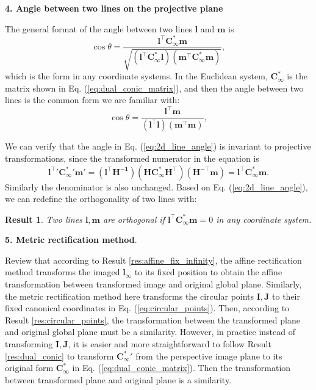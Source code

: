 \documentclass[12pt]{article}
\newtheorem{result}{Result}[section]
\numberwithin{equation}{section}
\begin{document}
\textbf{4. Angle between two lines on the projective plane}

The general format of the angle between two lines $\mathbf{l}$ and $\mathbf{m}$ is
\begin{equation}
\cos \theta = \frac{\mathbf{l^\top C_{\infty}^* m}}{\sqrt{(\mathbf{l^\top C_{\infty}^* l})(\mathbf{m^\top C_{\infty}^* m})}},
\label{eq:2d_line_angle}
\end{equation}
which is the form in any coordinate systems. In the Euclidean system, $\mathbf{C}_{\infty}^*$ is the matrix shown in Eq. (\ref{eq:dual_conic_matrix}), and then the angle between two lines is the common form we are familiar with:
\begin{equation*}
\cos \theta = \frac{\mathbf{l^\top m}}{(\mathbf{l^\top l})(\mathbf{m^\top m})},
\end{equation*}

We can verify that the angle in Eq. (\ref{eq:2d_line_angle}) is invariant to projective transformations, since the transformed numerator in the equation is 
\begin{equation*}
\mathbf{l^\top}' {\mathbf{C}_{\infty}^*}' \mathbf{m}' = (\mathbf{l^\top H^{-1}}) (\mathbf{H}\mathbf{C}_{\infty}^* \mathbf{H}^{\top})(\mathbf{H}^{-\top}\mathbf{m}) = \mathbf{l^\top} {\mathbf{C}_{\infty}^*} \mathbf{m}.
\end{equation*}
Similarly the denominator is also unchanged. Based on Eq. (\ref{eq:2d_line_angle}), we can redefine the orthogonality of two lines with:\\

\begin{result}
Two lines $\mathbf{l, m}$ are orthogonal if $\mathbf{l^\top C_{\infty}^* m} = 0$ in any coordinate system.
\label{res:line_orthogonal}
\end{result}


\textbf{5. Metric rectification method}. 

Review that according to Result \ref{res:affine_fix_infinity}, the affine rectification method transforms the imaged $\mathbf{l}_{\infty}$ to its fixed position to obtain the affine transformation between transformed image and original global plane. Similarly, the metric rectification method here transforms the circular points $\mathbf{I, J}$ to their fixed canonical coordinates in Eq. (\ref{eq:circular_points}). Then, according to Result \ref{res:circular_points}, the transformation between the transformed plane and original global plane must be a similarity. However, in practice instead of transforming $\mathbf{I, J}$, it is easier and more straightforward to follow Result \ref{res:dual_conic} to transform ${\mathbf{C}_{\infty}^*}'$ from the perspective image plane to its original form $\mathbf{C}_{\infty}^*$ in Eq. (\ref{eq:dual_conic_matrix}). Then the transformation between transformed plane and original plane is a similarity.
\end{document}
